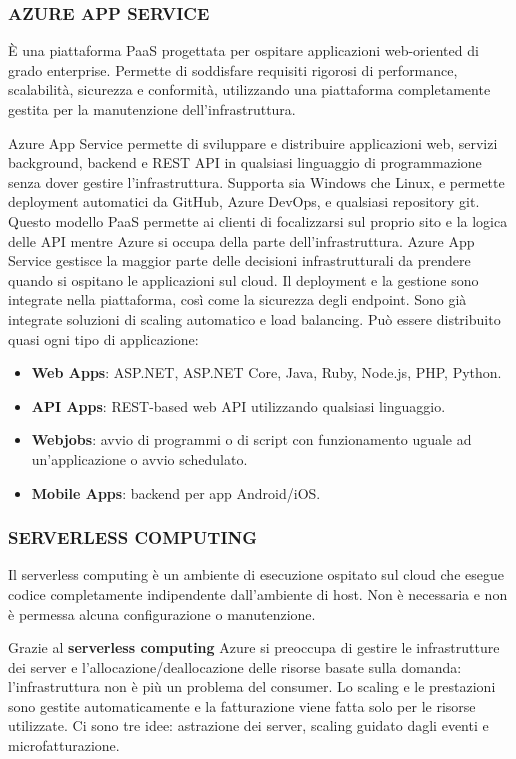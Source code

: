 \subsubsection{\textbf{AZURE APP SERVICE}}
È una piattaforma PaaS progettata per ospitare applicazioni web-oriented di grado enterprise. Permette di soddisfare requisiti rigorosi di performance, scalabilità, sicurezza e conformità, utilizzando una piattaforma completamente gestita per la manutenzione dell'infrastruttura.

\vspace{5mm}

Azure App Service permette di sviluppare e distribuire applicazioni web, servizi background, backend e REST API in qualsiasi linguaggio di programmazione senza dover gestire l'infrastruttura. Supporta sia Windows che Linux, e permette deployment automatici da GitHub, Azure DevOps, e qualsiasi repository git. Questo modello PaaS permette ai clienti di focalizzarsi sul proprio sito e la logica delle API mentre Azure si occupa della parte dell'infrastruttura. Azure App Service gestisce la maggior parte delle decisioni infrastrutturali da prendere quando si ospitano le applicazioni sul cloud. Il deployment e la gestione sono integrate nella piattaforma, così come la sicurezza degli endpoint. Sono già integrate soluzioni di scaling automatico e load balancing. Può essere distribuito quasi ogni tipo di applicazione:
\begin{itemize}
    \item \textbf{Web Apps}: ASP.NET, ASP.NET Core, Java, Ruby, Node.js, PHP, Python.
    \item \textbf{API Apps}: REST-based web API utilizzando qualsiasi linguaggio.
    \item \textbf{Webjobs}: avvio di programmi o di script con funzionamento uguale ad un'applicazione o avvio schedulato.
    \item \textbf{Mobile Apps}: backend per app Android/iOS.
\end{itemize}

\subsubsection{\textbf{SERVERLESS COMPUTING}}
Il serverless computing è un ambiente di esecuzione ospitato sul cloud che esegue codice completamente indipendente dall'ambiente di host. Non è necessaria e non è permessa alcuna configurazione o manutenzione.

Grazie al \textbf{serverless computing} Azure si preoccupa di gestire le infrastrutture dei server e l'allocazione/deallocazione delle risorse basate sulla domanda: l'infrastruttura non è più un problema del consumer. Lo scaling e le prestazioni sono gestite automaticamente e la fatturazione viene fatta solo per le risorse utilizzate. Ci sono tre idee: astrazione dei server, scaling guidato dagli eventi e microfatturazione. 

